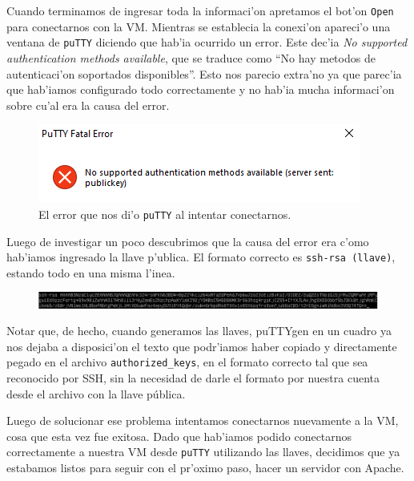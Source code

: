 \documentclass[11pt]{article}
\begin{document}
		Cuando terminamos de ingresar toda la informaci'on apretamos el bot'on \texttt{Open} para conectarnos con la VM. Mientras se establecia la conexi'on apareci'o una ventana de \texttt{puTTY} diciendo que hab'ia ocurrido un error. Este dec'ia \textit{No supported authentication methods available}, que se traduce como ``No hay metodos de autenticaci'on soportados disponibles''. Esto nos parecio extra'no ya que parec'ia que hab'iamos configurado todo correctamente y no hab'ia mucha informaci'on sobre cu'al era la causa del error.
		
		\begin{figure}[H]
    			\centering
    			\includegraphics[scale=0.8]{Images/Connection/puTTY_error.PNG}
    			\caption{El error que nos di'o \texttt{puTTY} al intentar conectarnos.}
    			\label{fig:puTTY_error}
		\end{figure}
		
		Luego de investigar un poco descubrimos que la causa del error era c'omo hab'iamos ingresado la llave p'ublica. El formato correcto es \texttt{ssh-rsa (llave)}, estando todo en una misma l'inea.
		
		\begin{figure}[H]
    			\centering
    			\includegraphics[scale=0.5]{Images/Connection/public_key_final.PNG}
    			\caption{}
    			\label{fig:public_key_final}
		\end{figure}
		
		Notar que, de hecho, cuando generamos las llaves, puTTYgen en un cuadro ya nos dejaba a disposici'on el texto que podr'iamos haber copiado y directamente pegado en el archivo \texttt{authorized\_keys}, en el formato correcto tal que sea reconocido por SSH, sin la necesidad de darle el formato por nuestra cuenta desde el archivo con la llave pública.
		
		Luego de solucionar ese problema intentamos conectarnos nuevamente a la VM, cosa que esta vez fue exitosa. Dado que hab'iamos podido conectarnos correctamente a nuestra VM desde \texttt{puTTY} utilizando las llaves, decidimos que ya estabamos listos para seguir con el pr'oximo paso, hacer un servidor con Apache.
		
\end{document}
